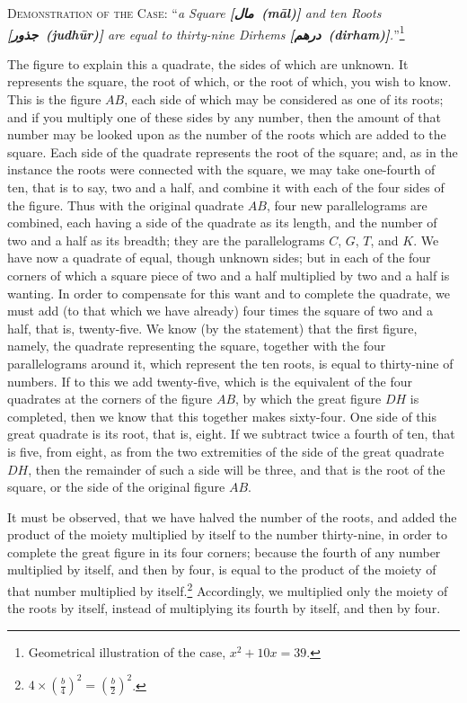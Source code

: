 \lettrine{D}{emonstration of the Case:} ``\textit{a Square \textbf{[\arabicfont\beginR مال\endR\ \textit{(m\=al)}]} and ten Roots \textbf{[\arabicfont\beginR جذور\endR\ \textit{(judh\=ur)}]} are equal to thirty-nine Dirhems \textbf{[\arabicfont\beginR درهم\endR\ \textit{(dirham)}]}.}''\footnote{Geometrical illustration of the case, $x^2 + 10x = 39$.}

The figure to explain this a quadrate, the sides of which are unknown. It represents the square, the root of which, or the root of which, you wish to know. This is the figure $AB$, each side of which may be considered as one of its roots; and if you multiply one of these sides by any number, then the amount of that number may be looked upon as the number of the roots which are added to the square. Each side of the quadrate represents the root of the square; and, as in the instance the roots were connected with the square, we may take one-fourth of ten, that is to say, two and a half, and combine it with each of the four sides of the figure. Thus with the original quadrate $AB$, four new parallelograms are combined, each having a side of the quadrate as its length, and the number of two and a half as its breadth; they are the parallelograms $C$, $G$, $T$, and $K$. We have now a quadrate of equal, though unknown sides; but in each of the four corners of which a square piece of two and a half multiplied by two and a half is wanting. In order to compensate for this want and to complete the quadrate, we must add (to that which we have already) four times the square of two and a half, that is, twenty-five. We know (by the statement) that the first figure, namely, the quadrate representing the square, together with the four parallelograms around it, which represent the ten roots, is equal to thirty-nine of numbers. If to this we add twenty-five, which is the equivalent of the four quadrates at the corners of the figure $AB$, by which the great figure $DH$ is completed, then we know that this together makes sixty-four. One side of this great quadrate is its root, that is, eight. If we subtract twice a fourth of ten, that is five, from eight, as from the two extremities of the side of the great quadrate $DH$, then the remainder of such a side will be three, and that is the root of the square, or the side of the original figure $AB$.

It must be observed, that we have halved the number of the roots, and added the product of the moiety multiplied by itself to the number thirty-nine, in order to complete the great figure in its four corners; because the fourth of any number multiplied by itself, and then by four, is equal to the product of the moiety of that number multiplied by itself.\footnote{$4 \times (\frac{b}{4})^2 = (\frac{b}{2})^2$.} Accordingly, we multiplied only the moiety of the roots by itself, instead of multiplying its fourth by itself, and then by four.

